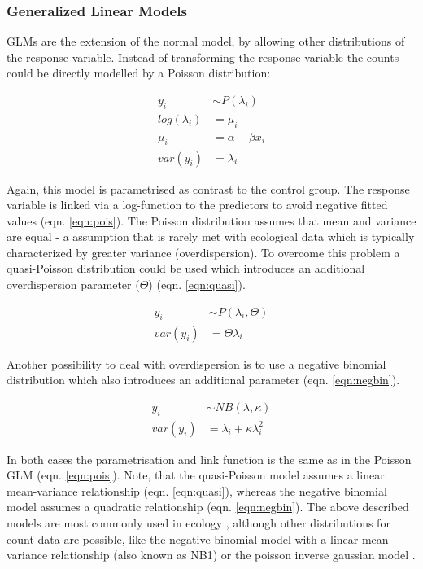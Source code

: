 \documentclass{scrartcl}
\begin{document}
\subsubsection{Generalized Linear Models}
GLMs are the extension of the normal model, by allowing other distributions of the response variable.
Instead of transforming the response variable the counts could be directly modelled by a Poisson distribution:

\begin{align}
  y_i &\sim P(\lambda_i) \nonumber \\
  log(\lambda_i) &= \mu_i \label{eqn:pois} \\
  \mu_i &= \alpha + \beta x_i \nonumber \\
  var(y_i) &= \lambda_i \nonumber
\end{align}

Again, this model is parametrised as contrast to the control group. 
The response variable is linked via a log-function to the predictors to avoid negative fitted values (eqn. \ref{eqn:pois}). 
The Poisson distribution assumes that mean and variance are equal - a assumption that is rarely met with ecological data which is typically characterized by greater variance (overdispersion).
To overcome this problem a quasi-Poisson distribution could be used which introduces an additional overdispersion parameter ($\Theta$) (eqn. \ref{eqn:quasi}).

\begin{align}
  y_i &\sim P(\lambda_i, \Theta) \label{eqn:quasi} \\
  var(y_i) &= \Theta \lambda_i  \nonumber
\end{align}

Another possibility to deal with overdispersion is to use a negative binomial distribution which also introduces an additional parameter (eqn. \ref{eqn:negbin}).

\begin{align}
  y_i &\sim NB(\lambda, \kappa) \label{eqn:negbin}  \\
  var(y_i) &= \lambda_i + \kappa \lambda_i^2 \nonumber
\end{align}

In both cases the parametrisation and link function is the same as in the Poisson GLM (eqn. \ref{eqn:pois}).
Note, that the quasi-Poisson model assumes a linear mean-variance relationship (eqn. \ref{eqn:quasi}), whereas the negative binomial model assumes a quadratic relationship (eqn. \ref{eqn:negbin}).
The above described models are most commonly used in ecology \citep{ver_hoef_quasi-poisson_2007}, although other distributions for count data are possible, like the negative binomial model with a linear mean variance relationship (also known as NB1) or the poisson inverse gaussian model \citep{hilbe_modeling_2014}.
\end{document}
